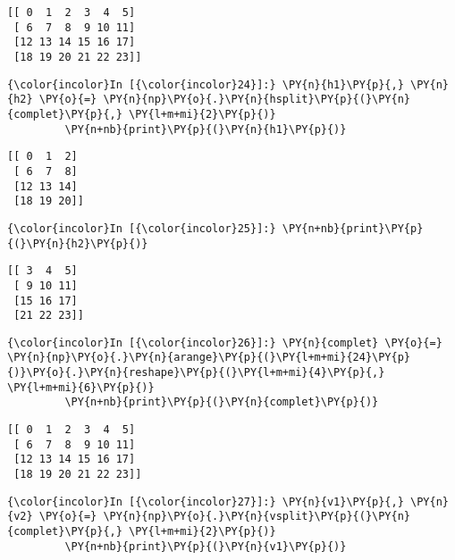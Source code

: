     \begin{Verbatim}[commandchars=\\\{\}]
[[ 0  1  2  3  4  5]
 [ 6  7  8  9 10 11]
 [12 13 14 15 16 17]
 [18 19 20 21 22 23]]

    \end{Verbatim}

    \begin{Verbatim}[commandchars=\\\{\}]
{\color{incolor}In [{\color{incolor}24}]:} \PY{n}{h1}\PY{p}{,} \PY{n}{h2} \PY{o}{=} \PY{n}{np}\PY{o}{.}\PY{n}{hsplit}\PY{p}{(}\PY{n}{complet}\PY{p}{,} \PY{l+m+mi}{2}\PY{p}{)}
         \PY{n+nb}{print}\PY{p}{(}\PY{n}{h1}\PY{p}{)}
\end{Verbatim}


    \begin{Verbatim}[commandchars=\\\{\}]
[[ 0  1  2]
 [ 6  7  8]
 [12 13 14]
 [18 19 20]]

    \end{Verbatim}

    \begin{Verbatim}[commandchars=\\\{\}]
{\color{incolor}In [{\color{incolor}25}]:} \PY{n+nb}{print}\PY{p}{(}\PY{n}{h2}\PY{p}{)}
\end{Verbatim}


    \begin{Verbatim}[commandchars=\\\{\}]
[[ 3  4  5]
 [ 9 10 11]
 [15 16 17]
 [21 22 23]]

    \end{Verbatim}

    \begin{Verbatim}[commandchars=\\\{\}]
{\color{incolor}In [{\color{incolor}26}]:} \PY{n}{complet} \PY{o}{=} \PY{n}{np}\PY{o}{.}\PY{n}{arange}\PY{p}{(}\PY{l+m+mi}{24}\PY{p}{)}\PY{o}{.}\PY{n}{reshape}\PY{p}{(}\PY{l+m+mi}{4}\PY{p}{,} \PY{l+m+mi}{6}\PY{p}{)}
         \PY{n+nb}{print}\PY{p}{(}\PY{n}{complet}\PY{p}{)}
\end{Verbatim}


    \begin{Verbatim}[commandchars=\\\{\}]
[[ 0  1  2  3  4  5]
 [ 6  7  8  9 10 11]
 [12 13 14 15 16 17]
 [18 19 20 21 22 23]]

    \end{Verbatim}

    \begin{Verbatim}[commandchars=\\\{\}]
{\color{incolor}In [{\color{incolor}27}]:} \PY{n}{v1}\PY{p}{,} \PY{n}{v2} \PY{o}{=} \PY{n}{np}\PY{o}{.}\PY{n}{vsplit}\PY{p}{(}\PY{n}{complet}\PY{p}{,} \PY{l+m+mi}{2}\PY{p}{)}
         \PY{n+nb}{print}\PY{p}{(}\PY{n}{v1}\PY{p}{)}
\end{Verbatim}


